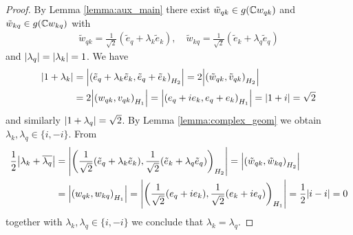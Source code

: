 \begin{proof}
	
	By Lemma \ref{lemma:aux_main} there exist $\tilde{w}_{qk} \in g(\mathbb{C} w_{qk})$ and $\tilde{w}_{kq} \in g(\mathbb{C} w_{kq})$ with
	\begin{align*}
		\tilde{w}_{qk} = \frac{1}{\sqrt{2}}(\tilde{e}_q + \lambda_k \tilde{e}_k), \quad \tilde{w}_{kq} = \frac{1}{\sqrt{2}}(\tilde{e}_k + \lambda_q \tilde{e}_q)
	\end{align*}
	and ${\left | \lambda_q \right |} = {\left | \lambda_k \right |} = 1$. We have
	\begin{align*}
		{\left | 1 + \lambda_k \right |} &= {\left | {\left ( \tilde{e}_q + \lambda_k \tilde{e}_k,  \tilde{e}_q + \tilde{e}_k \right )}_{H_2} \right |} = 2 {\left | {\left ( \tilde{w}_{qk}, \tilde{v}_{qk} \right )}_{H_2} \right |} \\
		&= 2{\left | {\left ( w_{qk}, v_{qk} \right )}_{H_1} \right |} = {\left | {\left ( e_q + ie_k,  e_q + e_k \right )}_{H_1} \right |} = {\left | 1 + i \right |} = \sqrt{2}
	\end{align*}
	and similarly ${\left | 1 + \lambda_q \right |} = \sqrt{2}$. By Lemma \ref{lemma:complex_geom} we obtain $\lambda_k, \lambda_q \in \{i, -i\}$. From
	\begin{align*}
		\frac{1}{2}{\left | \lambda_k + \overline{\lambda_q} \right |} &= {\left | {\left ( \frac{1}{\sqrt{2}}(\tilde{e}_q + \lambda_k \tilde{e}_k), \frac{1}{\sqrt{2}}(\tilde{e}_k + \lambda_{q} \tilde{e}_q) \right )}_{H_2} \right |} = {\left | {\left ( \tilde{w}_{qk}, \tilde{w}_{kq} \right )}_{H_2} \right |} \\
		&= {\left | {\left ( w_{qk}, w_{kq} \right )}_{H_1} \right |} = {\left | {\left ( \frac{1}{\sqrt{2}}(e_q + i e_k), \frac{1}{\sqrt{2}}(e_k + i e_q) \right )}_{H_1} \right |} = \frac{1}{2}{\left | i - i \right |} = 0
	\end{align*}
	together with $\lambda_k, \lambda_q \in \{i, -i\}$ we conclude that $\lambda_k = \lambda_q$.
\end{proof}


